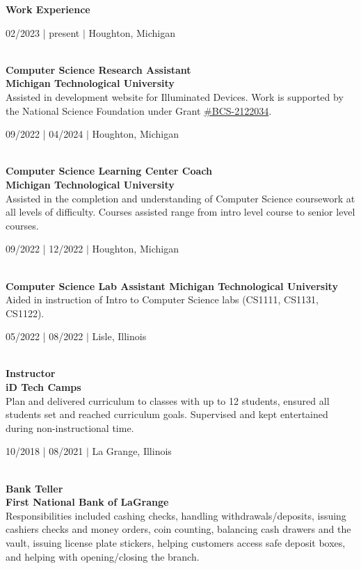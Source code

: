 \textbf{\large Work Experience\normalsize}\\
\begin{greytext}02/2023 | present $|$ Houghton, Michigan\end{greytext}\\
\textbf{Computer Science Research Assistant\\
Michigan Technological University}\\
Assisted in development website for Illuminated Devices. Work is supported by
the National Science Foundation under Grant \href{https://www.nsf.gov/awardsearch/showAward?AWD_ID=2122034}{\#BCS-2122034}.  
\\
\begin{greytext}09/2022 | 04/2024 $|$ Houghton, Michigan\end{greytext}\\
\textbf{Computer Science Learning Center Coach\\
Michigan Technological University}\\
Assisted in the completion and understanding of Computer Science coursework at
all levels of difficulty. Courses assisted range from intro level course to
senior level courses.
\\
\begin{greytext}09/2022 | 12/2022 $|$ Houghton, Michigan\end{greytext}\\
\textbf{Computer Science Lab Assistant
Michigan Technological University}\\
Aided in instruction of Intro to Computer Science labs (CS1111, CS1131, CS1122).
\\
\begin{greytext}05/2022 | 08/2022 $|$ Lisle, Illinois\end{greytext}\\
\textbf{Instructor\\
iD Tech Camps}\\
Plan and delivered curriculum to classes with up to 12 students, ensured all
students set and reached curriculum goals. Supervised and kept entertained
during non-instructional time.
\\
\begin{greytext}10/2018 | 08/2021 $|$ La Grange, Illinois\end{greytext}\\
\textbf{Bank Teller\\
First National Bank of LaGrange}\\
Responsibilities included cashing checks, handling withdrawals/deposits,
issuing cashiers checks and money orders, coin counting, balancing cash drawers
and the vault, issuing license plate stickers, helping customers access safe
deposit boxes, and helping with opening/closing the branch.

